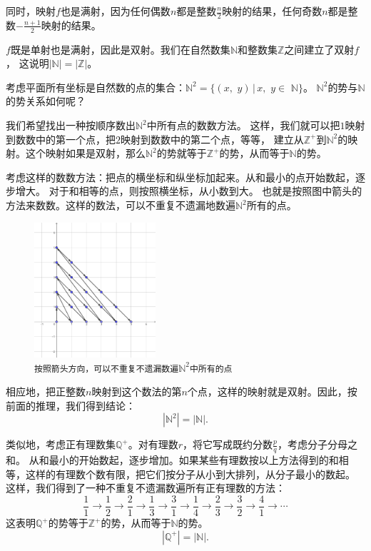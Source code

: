 \documentclass[12pt,UTF8]{ctexbook}
\begin{document}
同时，映射$f$也是满射，因为任何偶数$n$都是整数$\frac{n}{2}$映射的结果，任何奇数$n$都是整数$-\frac{n+1}{2}$映射的结果。

$f$既是单射也是满射，因此是双射。我们在自然数集$\mathbb{N}$和整数集$\mathbb{Z}$之间建立了双射$f$，
这说明$|\mathbb{N}| = |\mathbb{Z}|$。

考虑平面所有坐标是自然数的点的集合：$\mathbb{N}^2 = \{(x,\,\,y) \, | \, x, \,\, y \in \,\, \mathbb{N}\}$。
$\mathbb{N}^2$的势与$\mathbb{N}$的势关系如何呢？

我们希望找出一种按顺序数出$\mathbb{N}^2$中所有点的数数方法。
这样，我们就可以把$1$映射到数数中的第一个点，把$2$映射到数数中的第二个点，等等，
建立从$\mathbb{Z}^+$到$\mathbb{N}^2$的映射。这个映射如果是双射，那么$\mathbb{N}^2$的势就等于$\mathbb{Z}^+$的势，从而等于$\mathbb{N}$的势。

考虑这样的数数方法：把点的横坐标和纵坐标加起来。从和最小的点开始数起，逐步增大。
对于和相等的点，则按照横坐标，从小数到大。
也就是按照图中箭头的方法来数数。这样的数法，可以不重复不遗漏地数遍$\mathbb{N}^2$所有的点。

\begin{figure}[h] %
    \vspace{4pt}
    \centering
    \includegraphics[width=0.4\textwidth]{tu/无穷1.png}
    \caption*{\texttt{按照箭头方向，可以不重复不遗漏数遍}$\mathbb{N}^2$\texttt{中所有的点}}
\end{figure}

相应地，把正整数$n$映射到这个数法的第$n$个点，这样的映射就是双射。因此，按前面的推理，我们得到结论：
$$ |\mathbb{N}^2| = |\mathbb{N}|.$$

类似地，考虑正有理数集$\mathbb{Q}^+$。对有理数$r$，将它写成既约分数$\frac{p}{q}$，考虑分子分母之和。
从和最小的开始数起，逐步增加。如果某些有理数按以上方法得到的和相等，这样的有理数个数有限，把它们按分子从小到大排列，从分子最小的数起。
这样，我们得到了一种不重复不遗漏数遍所有正有理数的方法：
$$ \frac{1}{1} \rightarrow \frac{1}{2} \rightarrow \frac{2}{1} \rightarrow \frac{1}{3} \rightarrow \frac{3}{1} \rightarrow \frac{1}{4} \rightarrow \frac{2}{3} \rightarrow \frac{3}{2} \rightarrow \frac{4}{1} \rightarrow \cdots$$
这表明$\mathbb{Q}^+$的势等于$\mathbb{Z}^+$的势，从而等于$\mathbb{N}$的势。
$$ |\mathbb{Q}^+| = |\mathbb{N}|.$$
\end{document}

